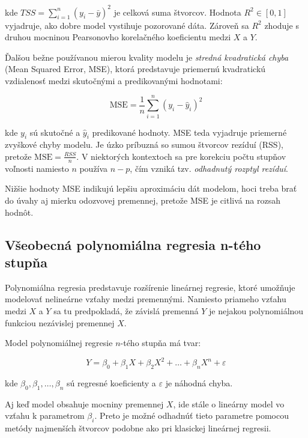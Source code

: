kde $TSS = \sum_{i=1}^{n}(y_i - \bar{y})^2$ je celková suma štvorcov. Hodnota $R^2 \in [0, 1]$ vyjadruje, ako dobre model vystihuje pozorované dáta. Zároveň sa $R^2$ zhoduje s druhou mocninou Pearsonovho korelačného koeficientu medzi $X$ a $Y$.

Ďalšou bežne používanou mierou kvality modelu je \textit{stredná kvadratická chyba} (Mean Squared Error, MSE), ktorá predstavuje priemernú kvadratickú vzdialenosť medzi skutočnými a predikovanými hodnotami:

\begin{equation}
\mathrm{MSE} = \frac{1}{n} \sum_{i=1}^{n} (y_i - \hat{y}_i)^2
\end{equation}

kde $y_i$ sú skutočné a $\hat{y}_i$ predikované hodnoty. MSE teda vyjadruje priemerné zvyškové chyby modelu. Je úzko príbuzná so sumou štvorcov rezíduí (RSS), pretože $\mathrm{MSE} = \frac{RSS}{n}$. V niektorých kontextoch sa pre korekciu počtu stupňov voľnosti namiesto $n$ používa $n - p$, čím vzniká tzv. \textit{odhadnutý rozptyl rezíduí}.

Nižšie hodnoty MSE indikujú lepšiu aproximáciu dát modelom, hoci treba brať do úvahy aj mierku odozvovej premennej, pretože MSE je citlivá na rozsah hodnôt.

\subsection{Všeobecná polynomiálna regresia n-tého stupňa}
\label{subsec:polynomial_regression}

Polynomiálna regresia predstavuje rozšírenie lineárnej regresie, ktoré umožňuje modelovať nelineárne vzťahy medzi premennými. Namiesto priameho vzťahu medzi $X$ a $Y$ sa tu predpokladá, že závislá premenná $Y$ je nejakou polynomiálnou funkciou nezávislej premennej $X$.

Model polynomiálnej regresie $n$-tého stupňa má tvar:

\begin{equation}
Y = \beta_0 + \beta_1 X + \beta_2 X^2 + \dots + \beta_n X^n + \varepsilon
\end{equation}

kde $\beta_0, \beta_1, \dots, \beta_n$ sú regresné koeficienty a $\varepsilon$ je náhodná chyba.

Aj keď model obsahuje mocniny premennej $X$, ide stále o lineárny model vo vzťahu k parametrom $\beta_i$. Preto je možné odhadnúť tieto parametre pomocou metódy najmenších štvorcov podobne ako pri klasickej lineárnej regresii.

